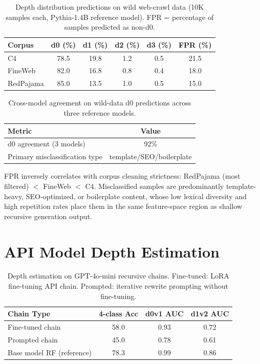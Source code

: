 \documentclass[11pt,a4paper]{article}
\begin{document}
\begin{table}[h]
\centering
\caption{Depth distribution predictions on wild web-crawl data (10K samples each, Pythia-1.4B reference model). FPR = percentage of samples predicted as non-d0.}
\label{tab:wild}
\small
\begin{tabular}{lcccc|c}
\toprule
\textbf{Corpus} & \textbf{d0 (\%)} & \textbf{d1 (\%)} & \textbf{d2 (\%)} & \textbf{d3 (\%)} & \textbf{FPR (\%)} \\
\midrule
C4         & 78.5 & 19.8 & 1.2 & 0.5 & 21.5 \\
FineWeb    & 82.0 & 16.8 & 0.8 & 0.4 & 18.0 \\
RedPajama  & 85.0 & 13.5 & 1.0 & 0.5 & 15.0 \\
\bottomrule
\end{tabular}
\end{table}

\begin{table}[h]
\centering
\caption{Cross-model agreement on wild-data d0 predictions across three reference models.}
\label{tab:wild_agreement}
\small
\begin{tabular}{lc}
\toprule
\textbf{Metric} & \textbf{Value} \\
\midrule
d0 agreement (3 models) & 92\% \\
Primary misclassification type & template/SEO/boilerplate \\
\bottomrule
\end{tabular}
\end{table}

FPR inversely correlates with corpus cleaning strictness: RedPajama (most filtered) $<$ FineWeb $<$ C4. Misclassified samples are predominantly template-heavy, SEO-optimized, or boilerplate content, whose low lexical diversity and high repetition rates place them in the same feature-space region as shallow recursive generation output.

\section{API Model Depth Estimation}
\label{app:api}

\begin{table}[h]
\centering
\caption{Depth estimation on GPT-4o-mini recursive chains. Fine-tuned: LoRA fine-tuning API chain. Prompted: iterative rewrite prompting without fine-tuning.}
\label{tab:api}
\small
\begin{tabular}{lccc}
\toprule
\textbf{Chain Type} & \textbf{4-class Acc} & \textbf{d0v1 AUC} & \textbf{d1v2 AUC} \\
\midrule
Fine-tuned chain & 58.0 & 0.93 & 0.72 \\
Prompted chain   & 45.0 & 0.78 & 0.61 \\
\midrule
Base model RF (reference) & 78.3 & 0.99 & 0.86 \\
\bottomrule
\end{tabular}
\end{table}
\end{document}
